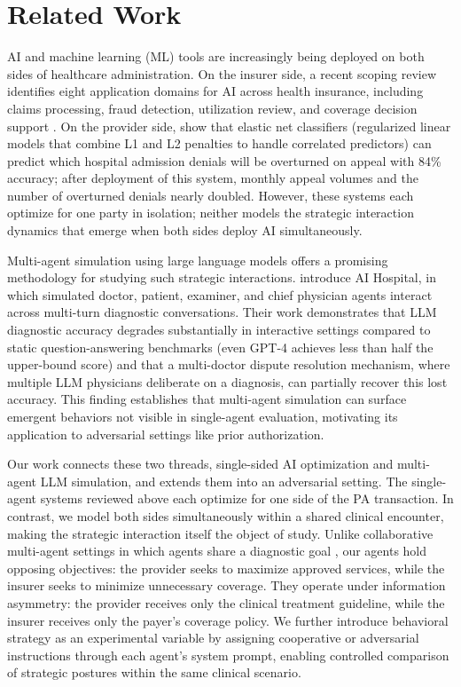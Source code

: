 \section{Related Work}
\label{sec:related}

AI and machine learning (ML) tools are increasingly being deployed on both sides of healthcare administration. On the insurer side, a recent scoping review identifies eight application domains for AI across health insurance, including claims processing, fraud detection, utilization review, and coverage decision support \citep{ramezani2025ai}. On the provider side, \citet{owolabi2025ml} show that elastic net classifiers (regularized linear models that combine L1 and L2 penalties to handle correlated predictors) can predict which hospital admission denials will be overturned on appeal with 84\% accuracy; after deployment of this system, monthly appeal volumes and the number of overturned denials nearly doubled. However, these systems each optimize for one party in isolation; neither models the strategic interaction dynamics that emerge when both sides deploy AI simultaneously.

Multi-agent simulation using large language models offers a promising methodology for studying such strategic interactions. \citet{fan2025aihospital} introduce AI Hospital, in which simulated doctor, patient, examiner, and chief physician agents interact across multi-turn diagnostic conversations. Their work demonstrates that LLM diagnostic accuracy degrades substantially in interactive settings compared to static question-answering benchmarks (even GPT-4 achieves less than half the upper-bound score) and that a multi-doctor dispute resolution mechanism, where multiple LLM physicians deliberate on a diagnosis, can partially recover this lost accuracy. This finding establishes that multi-agent simulation can surface emergent behaviors not visible in single-agent evaluation, motivating its application to adversarial settings like prior authorization.

Our work connects these two threads, single-sided AI optimization and multi-agent LLM simulation, and extends them into an adversarial setting. The single-agent systems reviewed above each optimize for one side of the PA transaction. In contrast, we model both sides simultaneously within a shared clinical encounter, making the strategic interaction itself the object of study. Unlike collaborative multi-agent settings in which agents share a diagnostic goal \citep{fan2025aihospital}, our agents hold opposing objectives: the provider seeks to maximize approved services, while the insurer seeks to minimize unnecessary coverage. They operate under information asymmetry: the provider receives only the clinical treatment guideline, while the insurer receives only the payer's coverage policy. We further introduce behavioral strategy as an experimental variable by assigning cooperative or adversarial instructions through each agent's system prompt, enabling controlled comparison of strategic postures within the same clinical scenario.
